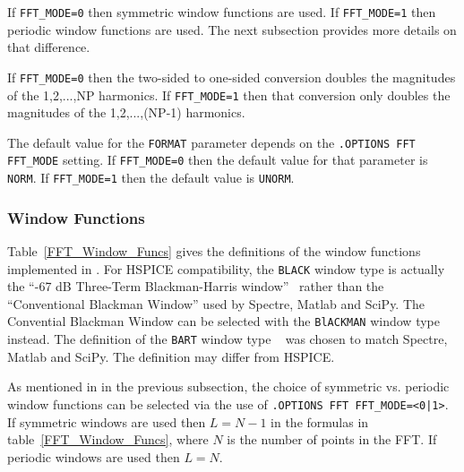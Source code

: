 If \texttt{FFT\_MODE=0} then symmetric window functions are used.  If
\texttt{FFT\_MODE=1} then periodic window functions are used.  The next
subsection provides more details on that difference.

If \texttt{FFT\_MODE=0} then the two-sided to one-sided conversion doubles
the magnitudes of the 1,2,...,NP harmonics. If \texttt{FFT\_MODE=1} then that
conversion only doubles the magnitudes of the 1,2,...,(NP-1) harmonics.

The default value for the \texttt{FORMAT} parameter depends on the
\texttt{.OPTIONS FFT FFT\_MODE} setting.  If \texttt{FFT\_MODE=0} then
the default value for that parameter is {\tt NORM}. If \texttt{FFT\_MODE=1}
then the default value is {\tt UNORM}.

\subsubsection{Window Functions}
Table~\ref{FFT_Window_Funcs} gives the definitions of the window functions
implemented in \Xyce{}.  For HSPICE compatibility, the {\tt BLACK} window type
is actually the ``-67 dB Three-Term Blackman-Harris window''~\cite{Doerry2017}
rather than the ``Conventional Blackman Window'' used by Spectre, Matlab and SciPy.
The Convential Blackman Window can be selected with the {\tt BlACKMAN} window
type instead.  The definition of the {\tt BART} window type ~\cite{oppenheimSchafer}
was chosen to match Spectre, Matlab and SciPy.  The \Xyce{} definition may differ
from HSPICE.

As mentioned in in the previous subsection, the choice of symmetric vs. periodic
window functions can be selected via the use of \texttt{.OPTIONS FFT FFT\_MODE=<0|1>}.
If symmetric windows are used then $L = N-1$ in the formulas in
table~\ref{FFT_Window_Funcs}, where $N$ is the number of points in the FFT.
If periodic windows are used then $L=N$.

